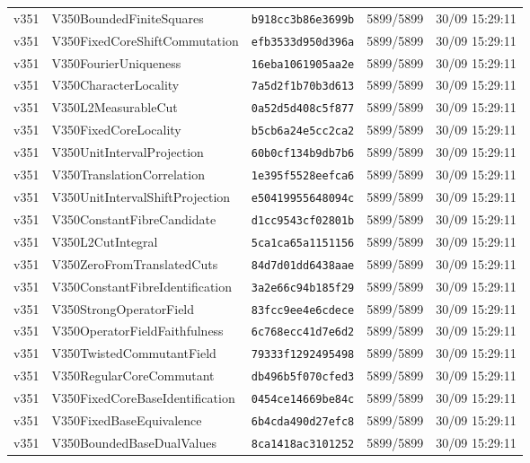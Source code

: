 \documentclass[11pt]{article}
\theoremstyle{definition}\newtheorem{deriv}{Derivation}
\begin{document}
{\begin{longtable}{@{}lllll@{}}
v351 & V350BoundedFiniteSquares & \texttt{b918cc3b86e3699b} & 5899/5899 & 30/09 15:29:11 \\
v351 & V350FixedCoreShiftCommutation & \texttt{efb3533d950d396a} & 5899/5899 & 30/09 15:29:11 \\
v351 & V350FourierUniqueness & \texttt{16eba1061905aa2e} & 5899/5899 & 30/09 15:29:11 \\
v351 & V350CharacterLocality & \texttt{7a5d2f1b70b3d613} & 5899/5899 & 30/09 15:29:11 \\
v351 & V350L2MeasurableCut & \texttt{0a52d5d408c5f877} & 5899/5899 & 30/09 15:29:11 \\
v351 & V350FixedCoreLocality & \texttt{b5cb6a24e5cc2ca2} & 5899/5899 & 30/09 15:29:11 \\
v351 & V350UnitIntervalProjection & \texttt{60b0cf134b9db7b6} & 5899/5899 & 30/09 15:29:11 \\
v351 & V350TranslationCorrelation & \texttt{1e395f5528eefca6} & 5899/5899 & 30/09 15:29:11 \\
v351 & V350UnitIntervalShiftProjection & \texttt{e50419955648094c} & 5899/5899 & 30/09 15:29:11 \\
v351 & V350ConstantFibreCandidate & \texttt{d1cc9543cf02801b} & 5899/5899 & 30/09 15:29:11 \\
v351 & V350L2CutIntegral & \texttt{5ca1ca65a1151156} & 5899/5899 & 30/09 15:29:11 \\
v351 & V350ZeroFromTranslatedCuts & \texttt{84d7d01dd6438aae} & 5899/5899 & 30/09 15:29:11 \\
v351 & V350ConstantFibreIdentification & \texttt{3a2e66c94b185f29} & 5899/5899 & 30/09 15:29:11 \\
v351 & V350StrongOperatorField & \texttt{83fcc9ee4e6cdece} & 5899/5899 & 30/09 15:29:11 \\
v351 & V350OperatorFieldFaithfulness & \texttt{6c768ecc41d7e6d2} & 5899/5899 & 30/09 15:29:11 \\
v351 & V350TwistedCommutantField & \texttt{79333f1292495498} & 5899/5899 & 30/09 15:29:11 \\
v351 & V350RegularCoreCommutant & \texttt{db496b5f070cfed3} & 5899/5899 & 30/09 15:29:11 \\
v351 & V350FixedCoreBaseIdentification & \texttt{0454ce14669be84c} & 5899/5899 & 30/09 15:29:11 \\
v351 & V350FixedBaseEquivalence & \texttt{6b4cda490d27efc8} & 5899/5899 & 30/09 15:29:11 \\
v351 & V350BoundedBaseDualValues & \texttt{8ca1418ac3101252} & 5899/5899 & 30/09 15:29:11 \\

\end{longtable}}
\end{document}
